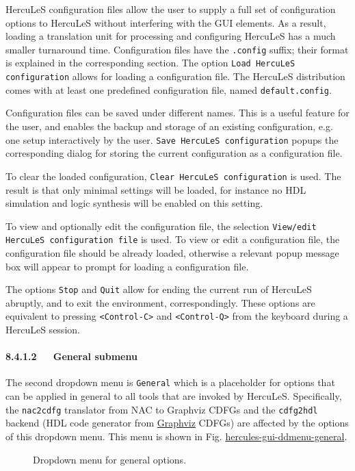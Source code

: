 \documentclass[a4paper]{article}
\begin{document}
HercuLeS configuration files allow the user to supply a full set of configuration options to HercuLeS without interfering with the GUI elements. As a result, loading a translation unit for processing and configuring HercuLeS has a much smaller turnaround time. Configuration files have the \texttt{.config} suffix; their format is explained in the corresponding section. The option \texttt{Load HercuLeS configuration} allows for loading a configuration file. The HercuLeS distribution comes with at least one predefined configuration file, named \texttt{default.config}.

Configuration files can be saved under different names. This is a useful feature for the user, and enables the backup and storage of an existing configuration, e.g. one setup interactively by the user. \texttt{Save HercuLeS configuration} popups the corresponding dialog for storing the current configuration as a configuration file.

To clear the loaded configuration, \texttt{Clear HercuLeS configuration} is used. The result is that only minimal settings will be loaded, for instance no HDL simulation and logic synthesis will be enabled on this setting.

To view and optionally edit the configuration file, the selection \texttt{View/edit HercuLeS configuration file} is used. To view or edit a configuration file, the configuration file should be already loaded, otherwise a relevant popup message box will appear to prompt for loading a configuration file.

The options \texttt{Stop} and \texttt{Quit} allow for ending the current run of HercuLeS abruptly, and to exit the environment, correspondingly. These options are equivalent to pressing \texttt{<Control-C>} and \texttt{<Control-Q>} from the keyboard during a HercuLeS session.


\paragraph{8.4.1.2~~~General submenu%
  \label{general-submenu}%
}

The second dropdown menu is \texttt{General} which is a placeholder for options that can be applied in general to all tools that are invoked by HercuLeS. Specifically, the \texttt{nac2cdfg} translator from NAC to Graphviz CDFGs and the \texttt{cdfg2hdl} backend (HDL code generator from \href{http://www.graphviz.org}{Graphviz} CDFGs) are affected by the options of this dropdown menu.
This menu is shown in Fig. \hyperref[hercules-gui-ddmenu-general]{hercules-gui-ddmenu-general}.
\begin{figure}
\label{hercules-gui-ddmenu-general}
\noindent{}
\caption{Dropdown menu for general options.}
\end{figure}
\end{document}
